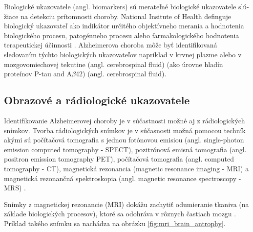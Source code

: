 Biologické ukazovatele (angl. biomarkers) sú merateľné biologické ukazovatele slú-žiace na detekciu prítomnosti choroby.
National Insitute of Health definguje biologický ukazovateľ ako indikátor určitého objektívneho merania a hodnotenia biologického procesu, patogénneho procesu alebo farmakologického hodnotenia terapeutickej účinnosti \cite{working2001biomarkers}. Alzheimerova choroba môže byť identifikovaná sledovaním týchto biologických ukazovateľov napríklad v krvnej plazme \cite{khan2016biomarkers} alebo v mozgovomiechovej tekutine (angl. cerebrospinal fluid) (ako úrovne hladín proteínov P-tau and A$\beta$42) \cite{khan2016biomarkers} (angl. cerebrospinal fluid).

\subsection{Obrazové a rádiologické ukazovatele}

Identifikovanie Alzheimerovej choroby je v súčastnosti možné aj z rádiologických snímkov. Tvorba rádiologických snímkov je v súčasnosti možná pomocou techník akými sú počítačová tomografia s jednou fotónovou emisiou (angl. single-photon emission computed tomography - SPECT),
pozitrónová emisná tomografia (angl. positron emission tomography PET), počítačová tomografia (angl. computed tomography - CT), magnetická rezonancia (magnetic resonance imaging - MRI) a magnetická rezonančná spektroskopia (angl. magnetic resonance spectroscopy - MRS) \cite{khan2016biomarkers}.

Snímky z magnetickej rezonancie (MRI) dokážu zachytiť odumieranie tkaniva (na základe biologických procesov), ktoré sa odohráva v rôznych častiach mozgu \cite{khan2016biomarkers}. Príklad takého snímku sa nachádza na obrázku \ref{fig:mri_brain_antrophy}.



